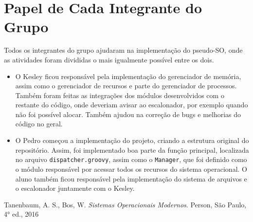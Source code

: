 \documentclass[12pt]{article}
\begin{document}
\section{Papel de Cada Integrante do Grupo}
Todos os integrantes do grupo ajudaram na implementação do pseudo-SO, onde as atividades foram divididas o mais igualmente possível entre os dois. 

\begin{itemize}
    \item O Kesley ficou responsável pela implementação do gerenciador de memória, assim como o gerenciador de recursos e parte do gerenciador de processos. Também foram feitas as integrações dos módulos desenvolvidos com o restante do código, onde deveriam avisar ao escalonador, por exemplo quando não foi possível alocar. Também ajudou na correção de bugs e melhorias do código no geral.
    \item O Pedro começou a implementação do projeto, criando a estrutura original do repositório. Assim, foi implementado boa parte da função principal, localizada no arquivo \texttt{dispatcher.groovy}, assim como o \texttt{Manager}, que foi definido como o módulo responsável por acessar todos os recursos do sistema operacional. O aluno também ficou responsável pela implementação do sistema de arquivos e o escalonador juntamente com o Kesley.
\end{itemize}

\begin{thebibliography}{00}
     Tanenbaum, A. S., Bos, W. \textit{Sistemas Operacionais Modernos}. Person, São Paulo, 4° ed., 2016
\end{thebibliography}
\end{document}
